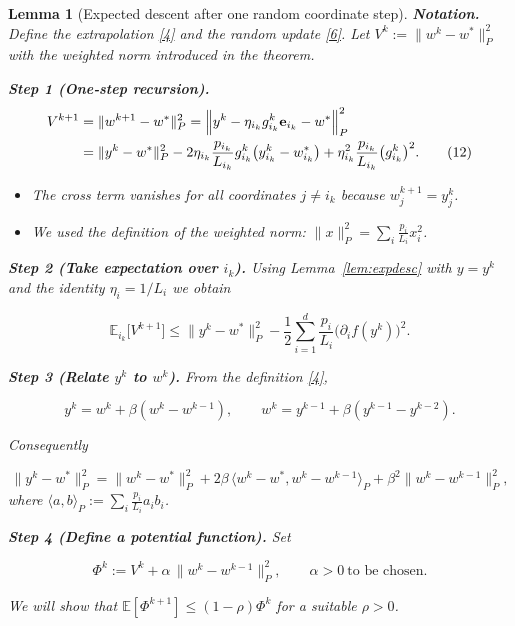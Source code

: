 \documentclass{article}
\newtheorem{lemma}{Lemma}
\newcommand{\E}{\mathbb{E}}
\newcommand{\ip}[2]{\langle #1,#2\rangle}
\newcommand{\be}{\mathbf{e}}
\begin{document}
\begin{lemma}[Expected descent after one random coordinate step]
\medskip
\noindent\textbf{Notation.}
Define the extrapolation \eqref{4} and the random update \eqref{6}.
Let $V^{k}:= \|w^{k}-w^{*}\|_{P}^{2}$ with the weighted norm introduced in the
theorem.

\medskip
\noindent\textbf{Step 1 (One‑step recursion).}
\begin{align}
V^{k+1}
&= \|w^{k+1}-w^{*}\|_{P}^{2}
   =\Bigl\|y^{k}-\eta_{i_{k}}g^{k}_{i_{k}}\be_{i_{k}}-w^{*}\Bigr\|_{P}^{2}\nonumber\\
&= \|y^{k}-w^{*}\|_{P}^{2}
   -2\eta_{i_{k}}\frac{p_{i_{k}}}{L_{i_{k}}}
      g^{k}_{i_{k}}\bigl(y^{k}_{i_{k}}-w^{*}_{i_{k}}\bigr)
   +\eta_{i_{k}}^{2}\frac{p_{i_{k}}}{L_{i_{k}}}
      \bigl(g^{k}_{i_{k}}\bigr)^{2}.                         \tag{12}
\end{align}
\begin{itemize}
\item[Step 1.1] The cross term vanishes for all coordinates $j\neq i_{k}$
because $w^{k+1}_{j}=y^{k}_{j}$.
\item[Step 1.2] We used the definition of the weighted norm:
$\|x\|_{P}^{2}= \sum_{i}\frac{p_{i}}{L_{i}}x_{i}^{2}$.
\end{itemize}
\medskip

\noindent\textbf{Step 2 (Take expectation over $i_{k}$).}
Using Lemma~\ref{lem:expdesc} with $y=y^{k}$ and the identity
$\eta_{i}=1/L_{i}$ we obtain

\[
\E_{i_{k}}\!\bigl[V^{k+1}\bigr]
\le \|y^{k}-w^{*}\|_{P}^{2}
    -\frac{1}{2}\sum_{i=1}^{d}\frac{p_{i}}{L_{i}}
         \bigl(\partial_{i}f(y^{k})\bigr)^{2}.                \tag{13}
\]

\medskip
\noindent\textbf{Step 3 (Relate $y^{k}$ to $w^{k}$).}
From the definition \eqref{4},

\[
y^{k}=w^{k}+ \beta (w^{k}-w^{k-1}),
\qquad
w^{k}=y^{k-1}+ \beta (y^{k-1}-y^{k-2}) .
\]

Consequently

\[
\|y^{k}-w^{*}\|_{P}^{2}
= \|w^{k}-w^{*}\|_{P}^{2}
  +2\beta\,\ip{w^{k}-w^{*}}{w^{k}-w^{k-1}}_{P}
  +\beta^{2}\|w^{k}-w^{k-1}\|_{P}^{2},                \tag{14}
\]
where $\ip{a}{b}_{P}:=\sum_{i}\frac{p_{i}}{L_{i}}a_{i}b_{i}$.

\medskip
\noindent\textbf{Step 4 (Define a potential function).}
Set

\[
\Phi^{k}:=V^{k} + \alpha\,\|w^{k}-w^{k-1}\|_{P}^{2},
\qquad\alpha>0\ \text{to be chosen.}                     \tag{15}
\]

We will show that $\E[\Phi^{k+1}]\le (1-\rho)\Phi^{k}$ for a suitable
$\rho>0$.


\end{lemma}
\end{document}

